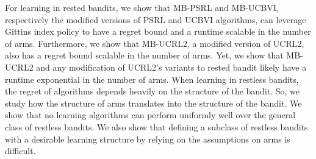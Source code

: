 For learning in rested bandits, we show that MB-PSRL and MB-UCBVI, respectively the modified versions of PSRL and UCBVI algorithms, can leverage Gittins index policy to have a regret bound and a runtime scalable in the number of arms. Furthermore, we show that MB-UCRL2, a modified version of UCRL2, also has a regret bound scalable in the number of arms. Yet, we show that MB-UCRL2 and any modification of UCRL2’s variants to rested bandit likely have a runtime exponential in the number of arms.
When learning in restless bandits, the regret of algorithms depends heavily on the structure of the bandit.
So, we study how the structure of arms translates into the structure of the bandit. We show that no learning algorithms can perform uniformly well over the general class of restless bandits. We also show that defining a subclass of restless bandits with a desirable learning structure by relying on the assumptions on arms is difficult.

